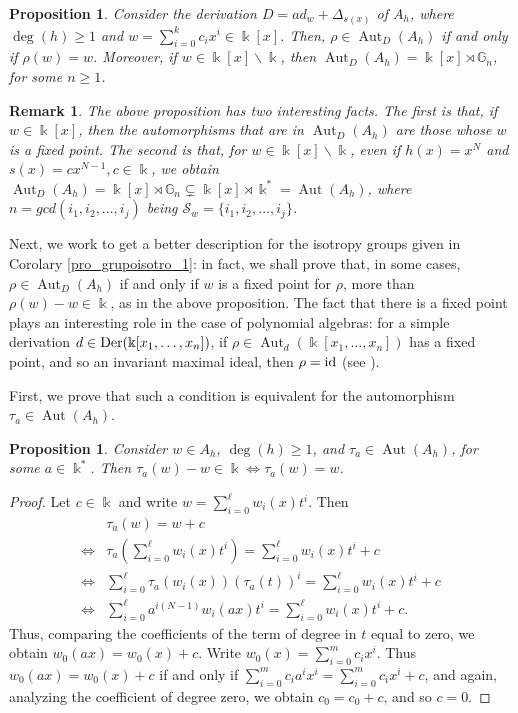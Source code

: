 \documentclass{article}
\numberwithin{equation}{section}\theoremstyle{plain}
\newtheorem{proposition}[theorem]{Proposition}
\newtheorem{remark}[theorem]{Remark}
\newcommand{\der}{{\rm Der}}
\DeclareMathOperator{\Aut}{Aut}
\begin{document}
\begin{proposition} \label{propwx}
    Consider the derivation $D=ad_w+\Delta_{s(x)}$ of $A_h$, where $\deg(h)\geq 1$ and $w = \sum_{i=0}^k c_ix^i \in \Bbbk[x]$.
    Then, $\rho \in \Aut_D(A_h)$ if and only if $\rho(w)=w$.
    Moreover, if $w \in \Bbbk[x] \backslash \Bbbk$, then $\Aut_D(A_h) = \Bbbk[x] \rtimes \mathbb{G}_n$, for some $n \geq 1$.
  \end{proposition}


\begin{remark}
The above proposition has two interesting facts.
The first is that, if $w \in \Bbbk[x]$, then the automorphisms that are in $\Aut_D(A_h)$ are those whose $w$ is a fixed point.
The second is that, for $w \in \Bbbk[x] \backslash \Bbbk$, even if $h(x)=x^N$ and $s(x)=cx^{N-1}, c \in \Bbbk$, we obtain $\Aut_D(A_h) = \Bbbk[x] \rtimes \mathbb{G}_n \subsetneq \Bbbk[x] \rtimes \Bbbk^\ast = \Aut(A_h)$, where $n = gcd(i_1,i_2,..., i_j)$ being $\mathcal{S}_w = \{i_1,i_2,..., i_j\}$.
\end{remark}

\medbreak

Next, we work to get a better description for the isotropy groups given in Corolary \ref{pro_grupoisotro_1}: in fact, we shall prove that, in some cases, $\rho \in \Aut_D(A_h)$ if and only if $w$ is a fixed point for $\rho$, more than $\rho (w) - w \in \Bbbk$, as in the above proposition.
The fact that there is a fixed point plays an interesting role in the case of polynomial algebras: for a simple derivation $d \in \der(\Bbbk[x_1,\ldots,x_n])$, if $\rho \in \Aut_d(\Bbbk[x_1,\ldots,x_n])$ has a fixed point, and so an invariant maximal ideal, then $\rho = \rm{id}$ (see \cite[Prop. 7]{B2016}). 

First, we prove that such a condition is equivalent for the automorphism $\tau_a \in \Aut(A_h)$.
  \begin{proposition}\label{rho_eq_tau}
     Consider $w \in A_h$, $\deg(h)\geq 1$, and $\tau_a \in \Aut(A_h)$, for some $a \in \Bbbk^\ast$.
    Then $\tau_a(w)-w \in \Bbbk \Longleftrightarrow \tau_a(w)=w$.
    \end{proposition}
    \begin{proof}
Let $c \in \Bbbk$ and write $w=\sum_{i=0}^\ell w_i(x) t^i$.
Then 
\begin{align*}
& \tau_a(w) = w + c  \\
\Longleftrightarrow & \tau_a\left(\sum_{i=0}^\ell w_i(x) t^i \right) = \sum_{i=0}^\ell w_i(x) t^i + c \\
\Longleftrightarrow & \sum_{i=0}^\ell \tau_a(w_i(x)) \left(\tau_a(t)\right)^i = \sum_{i=0}^\ell w_i(x) t^i + c \\
\Longleftrightarrow & \sum_{i=0}^\ell a^{i(N-1)} w_i(ax) t^i = \sum_{i=0}^\ell w_i(x) t^i + c.
\end{align*}
Thus, comparing the coefficients of the term of degree in $t$ equal to zero, we obtain
$w_0 (ax)=w_0(x)+c$.
Write $w_0(x)=\sum_{i=0}^{m}c_ix^i$.
Thus $w_0 (ax)=w_0(x)+c $ if and only if $\sum_{i=0}^{m}c_i a^i x^i = \sum_{i=0}^{m}c_ix^i + c$, and again, analyzing the coefficient of degree zero, we obtain $c_0 = c_0+c$, and so $c=0$.
\end{proof}
\end{document}
